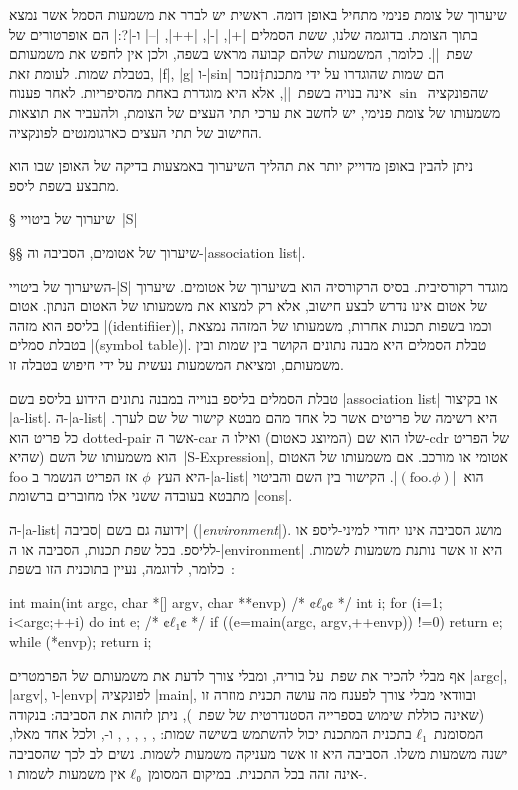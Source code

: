 שיערוך של צומת פנימי מתחיל באופן דומה. ראשית יש לברר את משמעות הסמל אשר
נמצא בתוך הצומת. בדוגמה שלנו, ששת הסמלים \T|+|, \T|-|, \T|++|, \T|--|
ו-\T|?:| הם אופרטורים של שפת~\E|\CPL|. כלומר, המשמעות שלהם קבועה מראש בשפה,
ולכן אין לחפש את משמעותם בטבלת שמות. לעומת זאת, \T|f|, \T|g| ו-\T|sin| הם שמות
שהוגדרו על ידי מתכנת†{נזכר שהפונקציה~$\sin$
אינה בנויה בשפת~\E|\CPL|, אלא היא מוגדרת באחת מהסיפריות.} לאחר פענוח משמעותו של
צומת פנימי, יש לחשב את ערכי תתי העצים של הצומת, ולהעביר את תוצאות החישוב של תתי
העצים כארגומנטים לפונקציה.

ניתן להבין באופן מדוייק יותר את תהליך השיערוך באמצעות בדיקה של האופן שבו הוא
מתבצע בשפת ליספ.

§ שיערוך של ביטויי~\E|S|

§§ שיערוך של אטומים, הסביבה וה-\E|association list|.

השיערוך של ביטויי-\E|S| מוגדר רקורסיבית. בסיס הרקורסיה הוא בשיערוך של אטומים.
שיערוך של אטום אינו נדרש לבצע חישוב, אלא רק למצוא את משמעותו של האטום הנתון.
אטום בליספ הוא מזהה \E|(identifiier)|, וכמו בשפות תכנות אחרות, משמעותו של המזהה
נמצאת בטבלת סמלים \E|(symbol table)|. טבלת הסמלים היא מבנה נתונים הקושר בין
שמות ובין משמעותם, ומציאת המשמעות נעשית על ידי חיפוש בטבלה זו.

טבלת הסמלים בליספ בנוייה במבנה נתונים הידוע בליספ בשם \E|association list|
או בקיצור \E|a-list|. ה-\E|a-list| היא רשימה של פריטים אשר כל אחד מהם מבטא
קישור של שם לערך. כל פריט הוא dotted-pair אשר ה-car שלו הוא שם (המיוצג כאטום)
ואילו ה-cdr של הפריט הוא משמעותו של השם (שהיא~\E|S-Expression|, אטומי או מורכב.
אם משמעותו של האטום foo היא העץ~$ϕ$ אז הפריט הנשמר ב-\E|a-list|
הוא~\E|$(\text{foo}.ϕ)$|. הקישור בין השם והביטוי מתבטא בעובדה ששני אלו מחוברים
ברשומת \E|cons|.

ה-\E|a-list| ידועה גם בשם \ע|סביבה| (\E|\emph{environment}|). מושג הסביבה אינו
יחודי למיני-ליספ או לליספ. בכל שפת תכנות, הסביבה או ה-\E|environment| היא זו
אשר נותנת משמעות לשמות. כלומר, לדוגמה, נעיין בתוכנית הזו בשפת~\CPL:
\begin{CPP}
int main(int argc, char *[] argv, char **envp) {
  /* ¢$ℓ₀$¢ */ int i;
  for (i=1; i<argc;++i) {
    do {
      int e;
      /* ¢$ℓ₁$¢ */ if ((e=main(argc, argv,++envp)) !=0)
        return e;
    } while (*envp);
  }
  return i;
}
\end{CPP}
אף מבלי להכיר את שפת~\CPL על בוריה, ומבלי צורך לדעת את משמעותם של הפרמטרים
\E|argc|, \E|argv|, ו-\E|envp| לפונקציה \E|main|, ובוודאי מבלי צורך לפענח מה
עושה תכנית מוזרה זו (שאינה כוללת שימוש בספרייה הסטנדרטית של שפת~\CPL), ניתן
לזהות את הסביבה: בנקודה המסומנת~$ℓ₁$ בתכנית המתכנת יכול להשתמש בשישה שמות:
, , , , , ו-, ולכל
אחד מאלו, ישנה משמעות משלו. הסביבה היא זו אשר מעניקה משמעות לשמות.
נשים לב לכך שהסביבה אינה זהה בכל התכנית. במיקום המסומן~$ℓ₀$ אין משמעות
לשמות  ו-.

